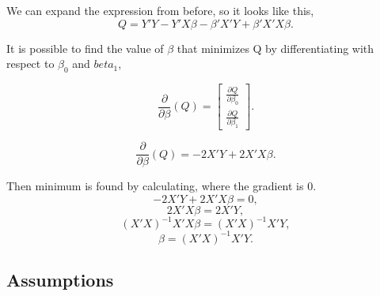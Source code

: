 \noindent We can expand the expression from before, so it looks like this,
$$Q=Y' Y -Y' X \beta -\beta' X' Y + \beta' X' X \beta .$$


\noindent It is possible to find the value of $\beta$ that minimizes Q by differentiating with respect to $\beta_0$ and $beta_1$,

$$
\frac{\partial}{\partial \beta}(Q)=
\left[
\begin{array}{c}
	\frac{\partial Q}{\partial \beta_0}\\ 
	\frac{\partial Q}{\partial \beta_1}
\end{array}
\right].
$$

$$
\frac{\partial}{\partial \beta}(Q)=-2 X' Y + 2X' X \beta .$$

\noindent Then minimum is found by calculating, where the gradient is 0.
$$-2 X' Y+ 2X' X \beta =0,$$
$$ 2X' X \beta = 2X' Y,$$
$$(X' X)^{-1} X' X \beta = (X' X)^{-1} X' Y,$$
$$ \beta=(X' X)^{-1} X' Y.$$

	\subsection{Assumptions}
	